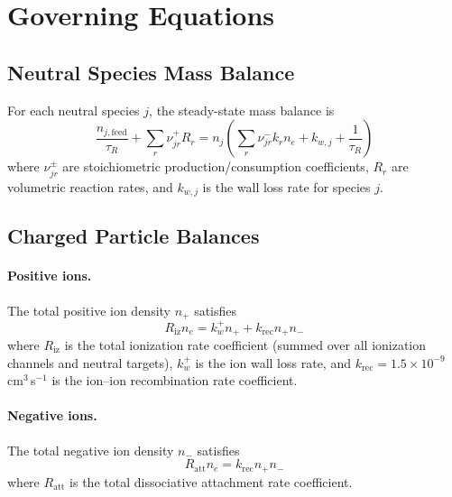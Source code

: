 \documentclass[11pt,a4paper]{article}
\newcommand{\nelec}{n_e}
\begin{document}
\section{Governing Equations}

\subsection{Neutral Species Mass Balance}

For each neutral species $j$, the steady-state mass balance is
\begin{equation}
\frac{n_{j,\mathrm{feed}}}{\tau_R} + \sum_r \nu_{jr}^+ R_r = n_j \left( \sum_r \nu_{jr}^- k_r \nelec + k_{w,j} + \frac{1}{\tau_R} \right)
\label{eq:neutral_balance}
\end{equation}
where $\nu_{jr}^\pm$ are stoichiometric production/consumption coefficients, $R_r$ are volumetric reaction rates, and $k_{w,j}$ is the wall loss rate for species $j$.

\subsection{Charged Particle Balances}

\paragraph{Positive ions.} The total positive ion density $n_+$ satisfies
\begin{equation}
R_\mathrm{iz} \nelec = k_w^+ n_+ + k_\mathrm{rec} n_+ n_-
\label{eq:pos_ion_balance}
\end{equation}
where $R_\mathrm{iz}$ is the total ionization rate coefficient (summed over all ionization channels and neutral targets), $k_w^+$ is the ion wall loss rate, and $k_\mathrm{rec} = 1.5 \times 10^{-9}$\,cm$^3$\,s$^{-1}$ is the ion--ion recombination rate coefficient.

\paragraph{Negative ions.} The total negative ion density $n_-$ satisfies
\begin{equation}
R_\mathrm{att} \nelec = k_\mathrm{rec} n_+ n_-
\label{eq:neg_ion_balance}
\end{equation}
where $R_\mathrm{att}$ is the total dissociative attachment rate coefficient.
\end{document}
